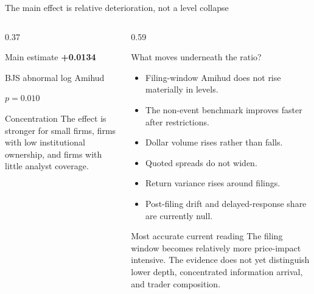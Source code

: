 \documentclass[aspectratio=169,10pt]{beamer}
\newcommand{\tightitems}{\setlength\itemsep{0.11cm}\setlength\parskip{0pt}}
\begin{document}
\begin{frame}[t]{The main effect is relative deterioration, not a level collapse}
\begin{columns}[T,onlytextwidth]
  \begin{column}{0.37\textwidth}
    \begin{alertblock}{Main estimate}
      \centering
      \LARGE \textbf{+0.0134}

      \normalsize BJS abnormal log Amihud

      \small $p=0.010$
    \end{alertblock}
    \begin{block}{Concentration}
      \footnotesize The effect is stronger for small firms, firms with low institutional ownership, and firms with little analyst coverage.
    \end{block}
  \end{column}
  \begin{column}{0.59\textwidth}
    \begin{block}{What moves underneath the ratio?}
    \footnotesize
    \begin{itemize}\tightitems
      \item Filing-window Amihud does not rise materially in levels.
      \item The non-event benchmark improves faster after restrictions.
      \item Dollar volume rises rather than falls.
      \item Quoted spreads do not widen.
      \item Return variance rises around filings.
      \item Post-filing drift and delayed-response share are currently null.
    \end{itemize}
    \end{block}
    \begin{exampleblock}{Most accurate current reading}
      \footnotesize The filing window becomes relatively more price-impact intensive. The evidence does not yet distinguish lower depth, concentrated information arrival, and trader composition.
    \end{exampleblock}
  \end{column}
\end{columns}
\end{frame}
\end{document}
